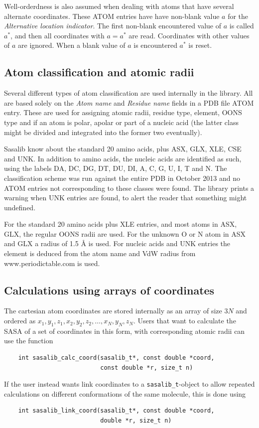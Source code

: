 \documentclass[a4paper,11pt]{article}
\begin{document}
Well-orderdness is also assumed when dealing with atoms that have
several alternate coordinates. These ATOM entries have have non-blank
value $a$ for the \emph{Alternative location indicator}. The first
non-blank encountered value of $a$ is called $a^*$, and then all
coordinates with $a = a^*$ are read. Coordinates with other values of
$a$ are ignored. When a blank value of $a$ is encountered $a^*$ is
reset.

\subsection{Atom classification and atomic radii}

Several different types of atom classification are used internally in
the library. All are based solely on the \emph{Atom name} and
\emph{Residue name} fields in a PDB file ATOM entry. These are used
for assigning atomic radii, residue type, element, OONS type and if an
atom is polar, apolar or part of a nucleic acid (the latter class
might be divided and integrated into the former two eventually).

Sasalib know about the standard 20 amino acids, plus ASX, GLX, XLE,
CSE and UNK. In addition to amino acids, the nucleic acids are
identified as such, using the labels DA, DC, DG, DT, DU, DI, A, C, G,
U, I, T and N. The classification scheme was run against the entire
PDB in October 2013 and no ATOM entries not corresponding to these
classes were found. The library prints a warning when UNK entries are
found, to alert the reader that something might undefined. 

For the standard 20 amino acids plus XLE entries, and most atoms in
ASX, GLX, the regular OONS radii are used. For the unknown O or N atom
in ASX and GLX a radius of 1.5 Å is used. For nucleic acids and UNK
entries the element is deduced from the atom name and VdW radius from
www.periodictable.com is used.

\subsection{Calculations using arrays of coordinates}

The cartesian atom coordinates are stored internally as an array of
size $3N$ and ordered as $x_1,y_1,z_1,x_2,y_2,z_2,\ldots,x_N,y_N,z_N$.
Users that want to calculate the SASA of a set of coordinates in this form,
with corresponding atomic radii can use the function
\begin{verbatim}
    int sasalib_calc_coord(sasalib_t*, const double *coord, 
                           const double *r, size_t n)
\end{verbatim}
If the user instead wants link coordinates to a
\texttt{sasalib\_t}-object to allow repeated calculations on different
conformations of the same molecule, this is done using
\begin{verbatim}
    int sasalib_link_coord(sasalib_t*, const double *coord,
                           double *r, size_t n)
\end{verbatim}
\end{document}
